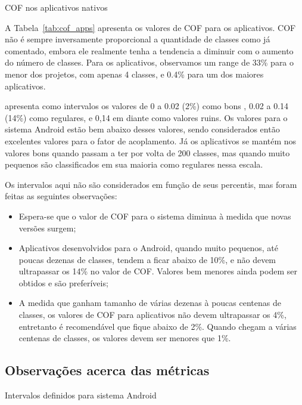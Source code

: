 \begin{table}[!htb]
\centering
{}

\caption{COF nos aplicativos nativos}
\label{tab:cof_apps}
\end{table}

A Tabela~\ref{tab:cof_apps} apresenta os valores de COF para os aplicativos. COF não é sempre inversamente proporcional a quantidade de classes como já comentado, embora ele realmente tenha a tendencia a diminuir com o aumento do número de classes. Para os aplicativos, observamos um range de 33\% para o menor dos projetos, com apenas 4 classes, e 0.4\% para um dos maiores aplicativos.

 apresenta como intervalos os valores de 0 a 0.02 (2\%) como bons , 0.02 a 0.14 (14\%) como regulares, e 0,14 em diante como valores ruins. Os valores para o sistema Android estão bem abaixo desses valores, sendo considerados então excelentes valores para o fator de acoplamento. Já os aplicativos se mantém nos valores bons quando passam a ter por volta de 200 classes, mas quando muito pequenos são classificados em sua maioria como regulares nessa escala. 

Os intervalos aqui não são considerados em função de seus percentis, mas foram feitas as seguintes observações:

\begin{itemize}
\item Espera-se que o valor de COF para o sistema diminua à medida que novas versões surgem;
\item Aplicativos desenvolvidos para o Android, quando muito pequenos, até poucas dezenas de classes, tendem a ficar abaixo de 10\%, e não devem ultrapassar os 14\% no valor de COF. Valores bem menores ainda podem ser obtidos e são preferíveis;
\item A medida que ganham tamanho de várias dezenas à poucas centenas de classes, os valores de COF para aplicativos não devem ultrapassar os 4\%, entretanto é recomendável que fique abaixo de 2\%. Quando chegam a várias centenas de classes, os valores devem ser menores que 1\%.
\end{itemize}

\subsection{Observações acerca das métricas}

\begin{table}[!htb]
\centering
{}

\caption{Intervalos definidos para sistema Android}
\label{tab:final_table_android}
\end{table}

